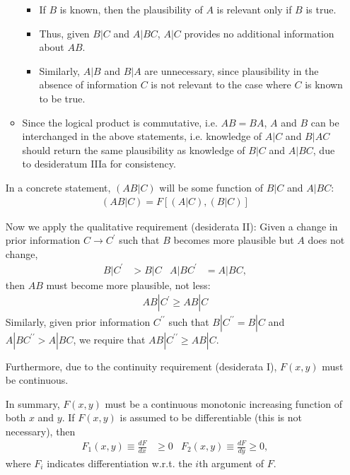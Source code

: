 \documentclass[9pt, letterpaper]{article}
\begin{document}
\begin{itemize}
\begin{itemize}
                \begin{itemize}
                    \item{If $B$ is known, then the plausibility of $A$ is relevant only if $B$ is true.}
                    \item{Thus, given $B|C$ and $A|BC$, $A|C$ provides no additional information about $AB$.}
                    \item{Similarly, $A|B$ and $B|A$ are unnecessary, since plausibility in the absence of information $C$ is not relevant to the case where $C$ is known to be true.}
                \end{itemize}
            \item{Since the logical product is commutative, i.e. $AB=BA$, $A$ and $B$ can be interchanged in the above statements, i.e. knowledge of $A|C$ and $B|AC$ should return the same plausibility as knowledge of $B|C$ and $A|BC$, due to desideratum IIIa for consistency.}
        \end{itemize}
    \begin{item}
        In a concrete statement, $\left(AB|C \right)$ will be some function of $B|C$ and $A|BC$:
        \begin{align*}
            \left(AB|C \right) = F \left[\left(A|C \right), \left(B|C \right) \right]
        \end{align*}
    \end{item}
    \begin{item}
        Now we apply the qualitative requirement (desiderata II): Given a change in prior information $C \rightarrow C^\prime$ such that $B$ becomes more plausible but $A$ does not change,
        \begin{align*}
            B|C^\prime &> B|C & A|BC^\prime &= A|BC,
        \end{align*}
        then $AB$ must become more plausible, not less:
        \begin{align*}
            AB|C^\prime \geq AB|C
        \end{align*}
        Similarly, given prior information $C^{\prime\prime}$ such that $B|C^{\prime\prime} = B|C$ and $A|BC^{\prime\prime} > A|BC$, we require that $AB|C^{\prime\prime} \geq AB|C.$
    \end{item}
    \begin{item}
        Furthermore, due to the continuity requirement (desiderata I), $F(x, y)$ must be continuous.
    \end{item}
    \begin{item}
        In summary, $F(x,y)$ must be a continuous monotonic increasing function of both $x$ and $y$. If $F(x,y)$ is assumed to be differentiable (this is not necessary), then
        \begin{align*}
            F_1(x,y) \equiv \frac{dF}{dx} & \geq 0 & F_2(x,y) \equiv \frac{dF}{dy} \geq 0,
        \end{align*}
        where $F_i$ indicates differentiation w.r.t. the $i$th argument of $F$.
    \end{item}
\end{itemize}
\end{document}
